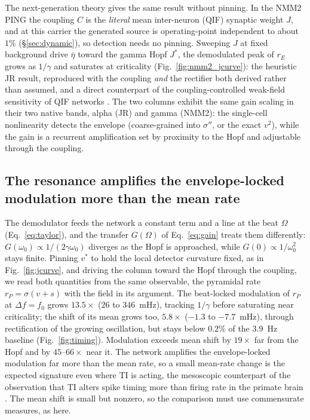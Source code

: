 \documentclass[11pt,a4paper]{article}
\newcommand{\Sig}{\sigma}
\begin{document}
The next-generation theory gives the same result without pinning. In the NMM2 PING the
coupling $C$ is the \emph{literal} mean inter-neuron (QIF) synaptic weight $J$, and at this
carrier the generated source is operating-point independent to about $1\%$
(\S\ref{sec:dynamic}), so detection needs no pinning. Sweeping $J$ at fixed background drive
$\bar\eta$ toward the gamma Hopf $J^*$, the demodulated peak of $r_E$ grows as
$1/\gamma$ and saturates at criticality (Fig.~\ref{fig:nmm2_jcurve}): the heuristic JR
result, reproduced with the coupling \emph{and} the rectifier both derived rather than
assumed, and a direct counterpart of the coupling-controlled weak-field sensitivity of
QIF networks \cite{clusella2023}. The two columns exhibit the same gain scaling in
their two native bands, alpha (JR) and gamma (NMM2): the single-cell nonlinearity
detects the envelope (coarse-grained into $\Sig''$, or the exact $v^2$), while the
gain is a recurrent amplification set by proximity to the
Hopf and adjustable through the coupling.

\subsection{The resonance amplifies the envelope-locked modulation more than the mean rate}\label{sec:timing}
The demodulator feeds the network a constant term and a line at the beat $\Omega$
(Eq.~\eqref{eq:taylor}), and the transfer $G(\Omega)$ of Eq.~\eqref{eq:gain} treats them
differently: $G(\omega_0)\propto1/(2\gamma\omega_0)$ diverges as the Hopf is approached,
while $G(0)\propto1/\omega_0^2$ stays finite. Pinning $v^*$ to hold the local detector
curvature fixed, as in Fig.~\ref{fig:jcurve}, and driving the column toward the Hopf
through the coupling, we read both quantities from the same observable, the pyramidal
rate $r_P=\Sig(v+s)$ with the field in its argument. The beat-locked modulation of $r_P$ at
$\Delta f=f_0$ grows $13.5\times$ ($26$ to $346$~mHz), tracking $1/\gamma$ before
saturating near criticality; the shift of its mean grows too, $5.8\times$ ($-1.3$ to
$-7.7$~mHz), through rectification of the growing oscillation, but stays below $0.2\%$ of
the $3.9$~Hz baseline (Fig.~\ref{fig:timing}). Modulation exceeds mean shift by $19\times$
far from the Hopf and by $45$--$66\times$ near it. The network amplifies the
envelope-locked modulation far more than the mean rate, so a small mean-rate change is
the expected signature even where TI is acting, the mesoscopic counterpart of the
observation that TI alters spike timing more than firing rate in the primate brain
\cite{vieira2024}. The mean shift is small but nonzero, so the comparison must use
commensurate measures, as here.
\end{document}
